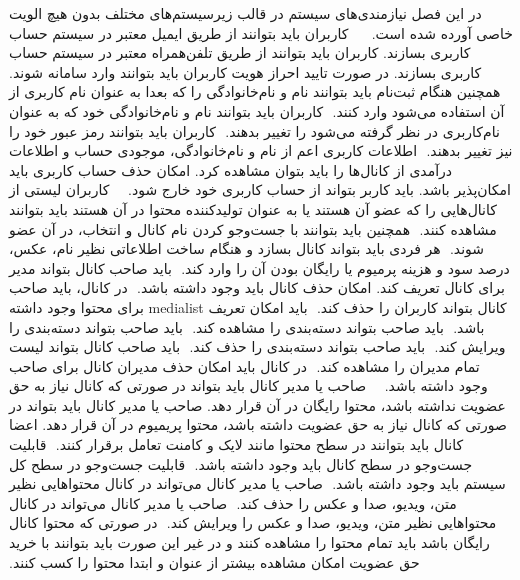 ‫
‫
‫در این فصل نیازمندی‌های سیستم در قالب زیرسیستم‌های مختلف بدون هیچ الویت خاصی آورده شده‌ است.
‫
‫
‫
‫
‫ کاربران باید بتوانند از طریق ایمیل معتبر در سیستم حساب کاربری بسازند.
‫‫ کاربران باید بتوانند از طریق تلفن‌همراه معتبر در سیستم حساب کاربری بسازند.
‫ در صورت تایید احراز هویت کاربران باید بتوانند وارد سامانه شوند.
‫‫ همچنین هنگام ثبت‌نام باید بتوانند نام و نام‌خانوادگی را که بعدا به عنوان نام کاربری از آن استفاده می‌شود وارد کنند.
‫
‫کاربران باید بتوانند نام و نام‌خانوادگی خود که به عنوان نام‌کاربری در نظر گرفته می‌شود را تغییر بدهند. 
‫
‫کاربران باید بتوانند رمز عبور خود را نیز تغییر بدهند. 
‫
‫اطلاعات کاربری اعم از نام و نام‌خانوادگی، موجودی حساب و اطلاعات درآمدی از کانال‌ها را باید بتوان مشاهده کرد.
‫ امکان حذف حساب کاربری باید امکان‌پذیر باشد.
‫ باید کاربر بتواند از حساب کاربری خود خارج شود.
‫
‫
‫
‫کاربران لیستی از کانال‌هایی را که عضو آن هستند یا به عنوان تولید‌کننده محتوا در آن هستند باید بتوانند مشاهده کنند.
‫
‫همچنین باید بتوانند با جست‌وجو کردن نام کانال و انتخاب، در آن عضو شوند.
‫
‫هر فردی باید بتواند کانال بسازد و هنگام ساخت اطلاعاتی نظیر نام، عکس، درصد سود و هزینه پرمیوم یا رایگان بودن آن را وارد کند.
‫
‫ باید صاحب کانال بتواند مدیر برای کانال تعریف کند.
‫ امکان حذف کانال باید وجود داشته باشد.
‫
‫در کانال، باید صاحب کانال بتواند کاربران را حذف کند.
‫
‫باید امکان تعریف medialist برای محتوا وجود داشته باشد.
‫
‫باید صاحب بتواند دسته‌بندی را مشاهده کند.
‫
‫باید صاحب بتواند دسته‌بندی را ویرایش کند.
‫
‫باید صاحب بتواند دسته‌بندی را حذف کند.
‫
‫باید صاحب کانال بتواند لیست تمام مدیران را مشاهده کند.
‫
‫در کانال باید امکان حذف مدیران کانال برای صاحب وجود داشته باشد.
‫
‫
‫
‫ صاحب یا مدیر کانال باید بتواند در صورتی که کانال نیاز به حق عضویت نداشته باشد، محتوا رایگان در آن قرار دهد.
‫ صاحب یا مدیر کانال باید بتواند در صورتی که کانال نیاز به حق عضویت داشته باشد، محتوا پریمیوم در آن قرار دهد.
‫ اعضا کانال باید بتوانند در سطح محتوا مانند لایک و کامنت تعامل برقرار کنند.
‫
‫قابلیت جست‌و‌جو در سطح کانال باید وجود داشته باشد. 
‫
‫قابلیت جست‌و‌جو در سطح کل سیستم باید وجود داشته باشد. 
‫
‫صاحب یا مدیر کانال می‌تواند در کانال محتواهایی نظیر متن، ویدیو، صدا و عکس را حذف کند. 
‫
‫صاحب یا مدیر کانال می‌تواند در کانال محتواهایی نظیر متن، ویدیو، صدا و عکس را ویرایش کند.
‫
‫در صورتی که محتوا کانال رایگان باشد باید تمام محتوا را مشاهده کنند و در غیر این صورت باید بتوانند با خرید حق عضویت امکان مشاهده بیشتر از عنوان و ابتدا محتوا را کسب کنند.
